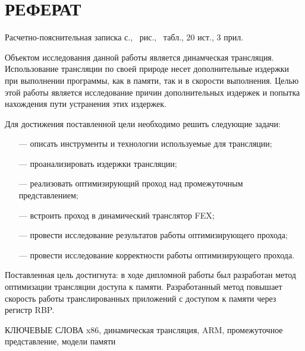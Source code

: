 \section*{РЕФЕРАТ}

Расчетно-пояснительная записка \pageref{LastPage} с., \totalfigures\ рис., \totaltables\ табл., 20 ист., 3 прил.

Объектом исследования данной работы является динамческая трансляция. Использование трансляции по своей природе несет дополнительные издержки при выполнении программы, как в памяти, так и в скорости выполнения. Целью этой работы является исследование причин дополнительных издержек и попытка нахождения пути устранения этих издержек.

Для достижения поставленной цели необходимо решить следующие задачи:

\begin{itemize}[leftmargin=1.6\parindent]
	\item [---] описать инструменты и технологии используемые для трансляции;
	\item [---] проанализировать издержки трансляции;
	\item [---] реализовать оптимизирующий проход над промежуточным представлением;
	\item [---] встроить проход в динамический транслятор FEX;
	\item [---] провести исследование результатов работы оптимизирующего прохода;
	\item [---] провести исследование корректности работы оптимизирующего прохода.
\end{itemize}

Поставленная цель достигнута: в ходе дипломной работы был разработан метод оптимизации трансляции доступа к памяти. Разработанный метод повышает скорость работы транслированных приложений с доступом к памяти через регистр RBP.

КЛЮЧЕВЫЕ СЛОВА
x86, динамическая трансляция, ARM, промежуточное представление, модели памяти

\pagebreak